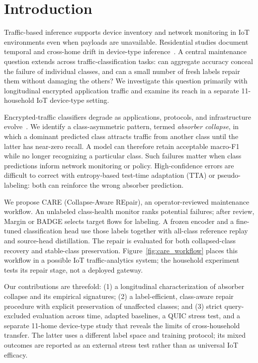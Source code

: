 \documentclass[journal]{IEEEtran}
\newcommand{\ours}{CARE}  %
\begin{document}

\section{Introduction}
\label{sec:intro}

Traffic-based inference supports device inventory and network monitoring in IoT environments even when payloads are unavailable. Residential studies document temporal and cross-home drift in device-type inference~\cite{pashamokhtari2023dynamic,azizi2025labelshift,azizi2026budget}. A central maintenance question extends across traffic-classification tasks: can aggregate accuracy conceal the failure of individual classes, and can a small number of fresh labels repair them without damaging the others? We investigate this question primarily with longitudinal encrypted application traffic and examine its reach in a separate 11-household IoT device-type setting.

Encrypted-traffic classifiers degrade as applications, protocols, and infrastructure evolve~\cite{soukup2025drift,malekghaini2023drift}. We identify a class-asymmetric pattern, termed \textit{absorber collapse}, in which a dominant predicted class attracts traffic from another class until the latter has near-zero recall. A model can therefore retain acceptable macro-F1 while no longer recognizing a particular class. Such failures matter when class predictions inform network monitoring or policy. High-confidence errors are difficult to correct with entropy-based test-time adaptation (TTA) or pseudo-labeling: both can reinforce the wrong absorber prediction.

We propose \ours{} (Collapse-Aware REpair), an operator-reviewed maintenance workflow. An unlabeled class-health monitor ranks potential failures; after review, Margin or BADGE selects target flows for labeling. A frozen encoder and a fine-tuned classification head use those labels together with all-class reference replay and source-head distillation. The repair is evaluated for both collapsed-class recovery and stable-class preservation. Figure~\ref{fig:care_workflow} places this workflow in a possible IoT traffic-analytics system; the household experiment tests its repair stage, not a deployed gateway.

Our contributions are threefold: (1) a longitudinal characterization of absorber collapse and its empirical signatures; (2) a label-efficient, class-aware repair procedure with explicit preservation of unaffected classes; and (3) strict query-excluded evaluation across time, adapted baselines, a QUIC stress test, and a separate 11-home device-type study that reveals the limits of cross-household transfer. The latter uses a different label space and training protocol; its mixed outcomes are reported as an external stress test rather than as universal IoT efficacy.
\end{document}
